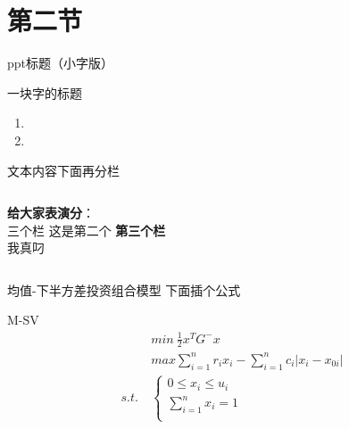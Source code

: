 \documentclass[10pt]{beamer}
\begin{document}
\section{第二节}%
\begin{frame}{\normalsize{ppt标题（小字版）}}
\begin{block}{一块字的标题}
    \begin{enumerate}
        \item 
        \item 
    \end{enumerate}
\end{block}
文本内容下面再分栏
\begin{columns}
    \centering

    \textbf{给大家表演分}：\\
    三个栏
    \centering
    这是第二个
    \textbf{第三个栏}\\
    我真叼
\end{columns}
\end{frame}
\begin{frame}
    
\end{frame}
\begin{frame}{均值-下半方差投资组合模型}
下面插个公式
\begin{block}{M-SV}
\begin{equation*}
    \begin{aligned}
    &min\ \frac 1 2 x^{T}G^{-}x\\
    &max\sum_{i=1}^n{r_i}x_i-\sum_{i=1}^n{c_i}|x_i-x_{0i}|\\
    s.t.\ &\left\{\begin{array}{l}
        0\leq x_i\leq u_i\\
        \sum_{i=1}^n{x_i}=1\\
    \end{array}\right.
    \end{aligned}
\end{equation*}
\end{block}
\end{frame}
\end{document}
